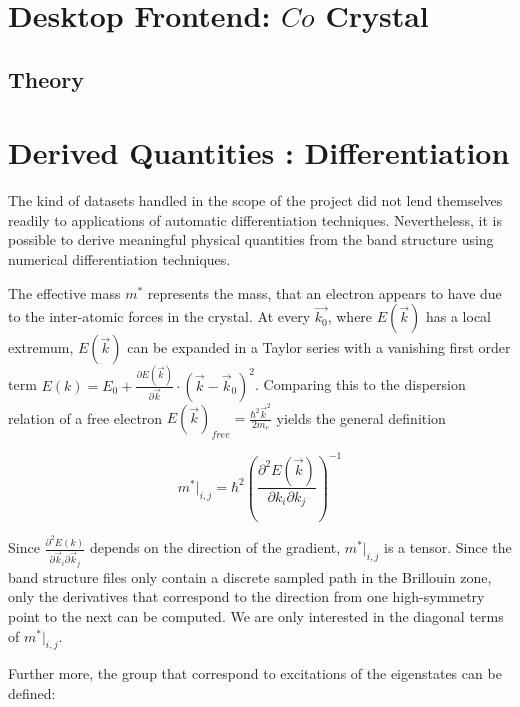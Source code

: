 \section{Desktop Frontend: $Co$ Crystal}

\subsection{Theory}



\section{Derived Quantities : Differentiation}
The kind of datasets handled in the scope of the project did not lend themselves
readily to applications of automatic differentiation techniques. Nevertheless,
it is possible to derive meaningful physical quantities from the band structure
using numerical differentiation techniques.

The effective mass $m^{*}$ represents the mass, that an electron appears to have due to the inter-atomic forces in the crystal. At every $\vec{k_0}$, where $E(\vec{k})$ has a local extremum, $E(\vec{k})$ can be expanded in a Taylor series with a vanishing first order term $E(k) = E_0 + \frac{\partial E(\vec{k})}{\partial \vec{k}} \cdot (\vec{k}-\vec{k}_0)^2$. Comparing this to the dispersion relation of a free electron $E(\vec{k})_{free} = \frac{\hbar^2 \vec{k}^2}{2 m_e}$ yields the general definition 

\begin{equation}
    m^{*}\big|_{i,j} = \hbar^2  \left(\frac{\partial^2E(\vec{k})}{\partial k_i \partial k_j}\right)^{-1}
\end{equation}

Since $\frac{\partial^2E(k)}{\partial \vec{k}_i \partial \vec{k}_j}$ depends on the direction of the gradient, $m^{*}\big|_{i,j}$ is a tensor. Since the band structure files only contain a discrete sampled path in the Brillouin zone, only the derivatives that correspond to the direction from one high-symmetry point to the next can be computed. We are only interested in the diagonal terms of $m^{*}\big|_{i,j}$.


Further more, the group that correspond to excitations of the eigenstates can be defined: 

